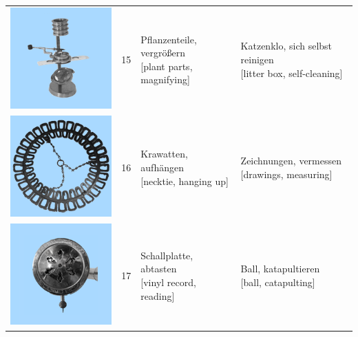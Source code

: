 \documentclass[
  english,
  doc,12pt,twoside,floatsintext]{apa7}
\begin{document}
\begin{center}
\begin{ThreePartTable}
{\begin{longtable}{llll}
\includegraphics[valign=c, scale=0.23]{../materials/unfamiliar/15.png} & 15 & \makecell[l]{Pflanzenteile, vergrößern\\{[plant parts, magnifying]}} & \makecell[l]{Katzenklo, sich selbst reinigen\\{[litter box, self-cleaning]}}\\
\includegraphics[valign=c, scale=0.23]{../materials/unfamiliar/16.png} & 16 & \makecell[l]{Krawatten, aufhängen\\{[necktie, hanging up]}} & \makecell[l]{Zeichnungen, vermessen\\{[drawings, measuring]}}\\
\includegraphics[valign=c, scale=0.23]{../materials/unfamiliar/17.png} & 17 & \makecell[l]{Schallplatte, abtasten\\{[vinyl record, reading]}} & \makecell[l]{Ball, katapultieren\\{[ball, catapulting]}}\\

\end{longtable}}
\end{ThreePartTable}
\end{center}
\end{document}
